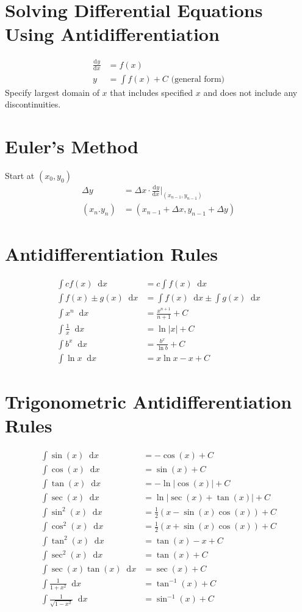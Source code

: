 \documentclass[12pt]{article}
\newcommand*{\rmaskip}{\setlength{\abovedisplayskip}{0pt}}
\newcommand*{\rmbskip}{\setlength{\belowdisplayskip}{0pt}}
\newcommand*{\rmskip}{\rmaskip \rmbskip}
\newcommand*{\isin}{\sin^{-1}}
\newcommand*{\itan}{\tan^{-1}}
\newcommand*{\dd}[3][]{\tfrac{\mathrm{d}^{#1}#2}{\mathrm{d}#3^{#1}}}
\newcommand*{\D}[1]{\mathop{}\!\mathrm{d} #1}
\begin{document}
\section*{Solving Differential Equations Using Antidifferentiation}
{\rmaskip\begin{align*}
  \dd{y}{x} &= f(x)\\
  y &= \int f(x) + C \text{ (general form)}
\end{align*}}%
Specify largest domain of \(x\) that includes specified \(x\) and does not
include any discontinuities.
\section*{Euler's Method}
Start at \((x_0,y_0)\)
{\rmbskip\begin{align*}
  \Delta y &= \Delta x \cdot \dd{y}{x} \biggr|_{(x_{n-1},y_{n-1})} \\
  (x_n.y_n) &= (x_{n-1} + \Delta x, y_{n-1} + \Delta y)
\end{align*}}%
\section*{Antidifferentiation Rules}
{\rmskip\begin{align*}
  \int cf(x) \D{x} &= c \int f(x) \D{x}\\
  \int f(x) \pm g(x) \D{x} &= \int f(x) \D{x} \pm \int g(x) \D{x}\\
  \int x^n \D{x} &= \frac{x^{n+1}}{n+1} + C\\
  \int \frac{1}{x} \D{x} &= \ln|x| + C\\
  \int b^x \D{x} &= \frac{b^x}{\ln b} + C\\
  \int \ln x \D{x} &= x\ln x - x + C
\end{align*}}%
\section*{Trigonometric Antidifferentiation Rules}
{\rmskip\begin{align*}
  \int \sin(x) \D{x} &= -\cos(x) + C\\
  \int \cos(x) \D{x} &= \sin(x) + C\\
  \int \tan(x) \D{x} &= -\ln|\cos(x)| + C\\
  \int \sec(x) \D{x} &= \ln|\sec(x)+\tan(x)| + C\\
  \int \sin^2(x) \D{x} &= \frac{1}{2} (x - \sin(x)\cos(x)) + C\\
  \int \cos^2(x) \D{x} &= \frac{1}{2} (x + \sin(x)\cos(x)) + C\\
  \int \tan^2(x) \D{x} &= \tan(x) - x + C\\
  \int \sec^2(x) \D{x} &= \tan(x) + C\\
  \int \sec(x) \tan(x) \D{x} &= \sec(x) + C\\
  \int \frac{1}{1+x^2} \D{x} &= \itan(x) + C\\
  \int \frac{1}{\sqrt{1-x^2}} \D{x} &= \isin(x) + C
\end{align*}}%
\end{document}
